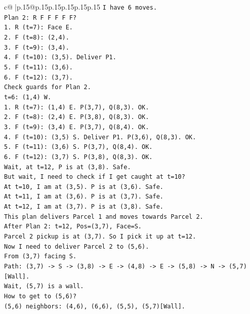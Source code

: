 \documentclass{article}
\begin{document}
{\begin{supertabular}{c@{$\;$}|p{.15\linewidth}@{}p{.15\linewidth}p{.15\linewidth}p{.15\linewidth}p{.15\linewidth}p{.15\linewidth}}
{{{\texttt{I have 6 moves.} \\
\texttt{Plan 2: R F F F F F?} \\
\texttt{1. R (t=7): Face E.} \\
\texttt{2. F (t=8): (2,4).} \\
\texttt{3. F (t=9): (3,4).} \\
\texttt{4. F (t=10): (3,5). Deliver P1.} \\
\texttt{5. F (t=11): (3,6).} \\
\texttt{6. F (t=12): (3,7).} \\
\texttt{Check guards for Plan 2.} \\
\texttt{t=6: (1,4) W.} \\
\texttt{1. R (t=7): (1,4) E. P(3,7), Q(8,3). OK.} \\
\texttt{2. F (t=8): (2,4) E. P(3,8), Q(8,3). OK.} \\
\texttt{3. F (t=9): (3,4) E. P(3,7), Q(8,4). OK.} \\
\texttt{4. F (t=10): (3,5) S. Deliver P1. P(3,6), Q(8,3). OK.} \\
\texttt{5. F (t=11): (3,6) S. P(3,7), Q(8,4). OK.} \\
\texttt{6. F (t=12): (3,7) S. P(3,8), Q(8,3). OK.} \\
\texttt{Wait, at t=12, P is at (3,8). Safe.} \\
\texttt{But wait, I need to check if I get caught at t=10?} \\
\texttt{At t=10, I am at (3,5). P is at (3,6). Safe.} \\
\texttt{At t=11, I am at (3,6). P is at (3,7). Safe.} \\
\texttt{At t=12, I am at (3,7). P is at (3,8). Safe.} \\
\texttt{This plan delivers Parcel 1 and moves towards Parcel 2.} \\
\texttt{After Plan 2: t=12, Pos=(3,7), Face=S.} \\
\texttt{Parcel 2 pickup is at (3,7). So I pick it up at t=12.} \\
\texttt{Now I need to deliver Parcel 2 to (5,6).} \\
\texttt{From (3,7) facing S.} \\
\texttt{Path: (3,7) {-}> S {-}> (3,8) {-}> E {-}> (4,8) {-}> E {-}> (5,8) {-}> N {-}> (5,7) {[}Wall{]}.} \\
\texttt{Wait, (5,7) is a wall.} \\
\texttt{How to get to (5,6)?} \\
\texttt{(5,6) neighbors: (4,6), (6,6), (5,5), (5,7){[}Wall{]}.} \\
}}}
\end{supertabular}}
\end{document}
